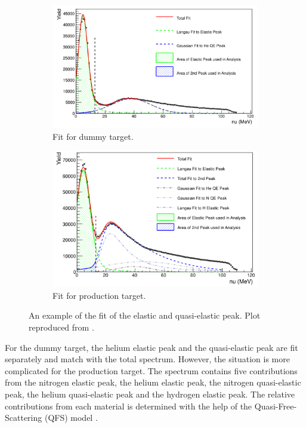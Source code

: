 \begin{figure}[tb!]
  \centering
  \begin{subfigure}[t]{0.52\textwidth}
    \includegraphics[width=\textwidth]{figs/packing-fraction-dummy.png}
    \caption{Fit for dummy target.}
  \end{subfigure}
  \begin{subfigure}[t]{0.46\textwidth}
    \includegraphics[width=\textwidth]{figs/packing-fraction-production.png}
    \caption{Fit for production target.}
  \end{subfigure}
  \caption[An example of the fit of the elastic and quasi-elastic peak.]{An example of the fit of the elastic and quasi-elastic peak. Plot reproduced from \cite{Cummings2015}. \label{C7S2F6}}
\end{figure}

For the dummy target, the helium elastic peak and the quasi-elastic peak are fit separately and match with the total spectrum. However, the situation is more complicated for the production target. The spectrum contains five contributions from the nitrogen elastic peak, the helium elastic peak, the nitrogen quasi-elastic peak, the helium quasi-elastic peak and the hydrogen elastic peak. The relative contributions from each material is determined with the help of the Quasi-Free-Scattering (QFS) model \cite{Lightbody1988}.

